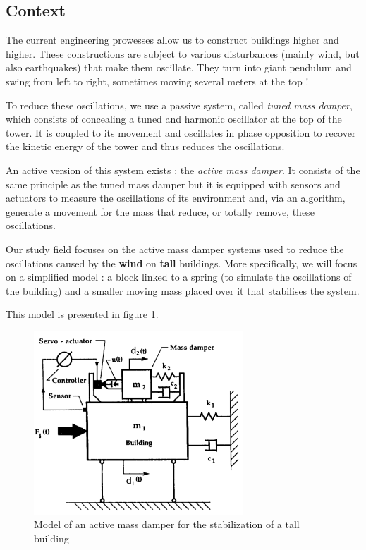 \subsection{Context}
The current engineering prowesses allow us to construct buildings higher and higher. These constructions are subject to various disturbances (mainly wind, but also earthquakes) that make them oscillate. They turn into giant pendulum and swing from left to right, sometimes moving several meters at the top !\cite{YouTube_minutephysics}\par
To reduce these oscillations, we use a passive system, called {\it tuned mass damper}, which consists of concealing a tuned and harmonic oscillator at the top of the tower. It is coupled to its movement and oscillates in phase opposition to recover the kinetic energy of the tower and thus reduces the oscillations.\cite{Wikipedia_amortisseur_tmd}\par
An active version of this system exists : the {\it active mass damper}. It consists of the same principle as the tuned mass damper but it is equipped with sensors and actuators to measure the oscillations of its environment and, via an algorithm, generate a movement for the mass that reduce, or totally remove, these oscillations.\cite{sciencedirect_amd}\par
Our study field focuses on the active mass damper systems used to reduce the oscillations caused by the {\bf wind} on {\bf tall} buildings. More specifically, we will focus on a simplified model : a block linked to a spring (to simulate the oscillations of the building) and a smaller moving mass placed over it that stabilises the system.\par
This model is presented in figure \ref{fig:schema}.
\begin{figure}[!ht]
    \centering
    \includegraphics[width=0.7\textwidth]{resources/pdf/open-loop-diagram.pdf}
    \caption{Model of an active mass damper for the stabilization of a tall building \cite{sciencedirect_amd_2}}
    \label{fig:schema}
\end{figure}
